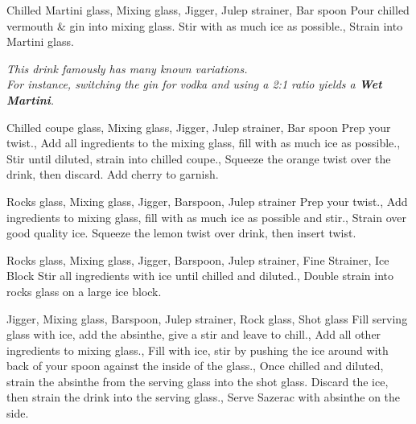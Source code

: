 \documentclass[../main.tex]{subfiles}
\begin{document}

{Chilled Martini glass, Mixing glass, Jigger, Julep strainer, Bar spoon}
{
    {Pour chilled vermouth \& gin into mixing glass. Stir with as much ice as possible.}, 
    Strain into Martini glass.
}

\begin{center}
    \textit{This drink famously has many known variations.\\
    For instance, switching the gin for vodka and using a 2:1 ratio yields a \textbf{Wet Martini}.}
\end{center}

\cocktailDivider

{Chilled coupe glass, Mixing glass, Jigger, Julep strainer, Bar spoon}
{
	{Prep your twist.},
	{Add all ingredients to the mixing glass, fill with as much ice as possible.},
	{Stir until diluted, strain into chilled coupe.},
	{Squeeze the orange twist over the drink, then discard. Add cherry to garnish.}
}

\cocktailDivider

{Rocks glass, Mixing glass, Jigger, Barspoon, Julep strainer}
{
	Prep your twist.,
	{Add ingredients to mixing glass, fill with as much ice as possible and stir.},
    {Strain over good quality ice.}
    {Squeeze the lemon twist over drink, then insert twist.}
}

\cocktailDivider

{Rocks glass, Mixing glass, Jigger, Barspoon, Julep strainer, Fine Strainer, Ice Block}
{
    Stir all ingredients with ice until chilled and diluted.,
    Double strain into rocks glass on a large ice block.
}

\newpage

{Jigger, Mixing glass, Barspoon, Julep strainer, Rock glass, Shot glass}
{
    {Fill serving glass with ice, add the absinthe, give a stir and leave to chill.},
    {Add all other ingredients to mixing glass.},
    {Fill with ice, stir by pushing the ice around with back of your spoon against the inside of the glass.},
    {Once chilled and diluted, strain the absinthe from the serving glass into the shot glass. 
    Discard the ice, then strain the drink into the serving glass.},
    {Serve Sazerac with absinthe on the side.}
}
\end{document}
